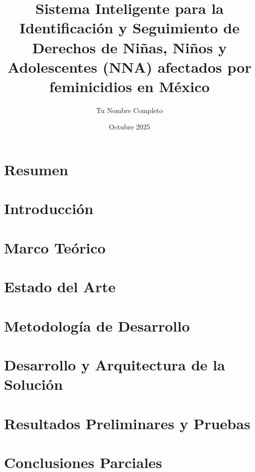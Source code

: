 \documentclass[12pt, letterpaper]{report}
\title{Sistema Inteligente para la Identificación y Seguimiento de Derechos de Niñas, Niños y Adolescentes (NNA) afectados por feminicidios en México}
\author{Tu Nombre Completo}
\date{Octubre 2025}
\begin{document}


\chapter*{Resumen}


\tableofcontents
\listoftables
\listoffigures

\chapter{Introducción}


\chapter{Marco Teórico}


\chapter{Estado del Arte}


\chapter{Metodología de Desarrollo}


\chapter{Desarrollo y Arquitectura de la Solución}


\chapter{Resultados Preliminares y Pruebas}


\chapter{Conclusiones Parciales}

\end{document}
